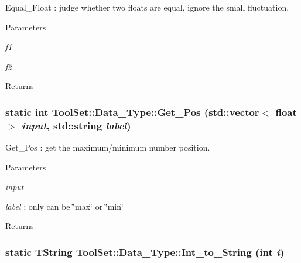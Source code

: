 Equal\_\-Float : judge whether two floats are equal, ignore the small fluctuation. 
\begin{DoxyParams}{Parameters}
\item[{\em f1}]\item[{\em f2}]\end{DoxyParams}
\begin{DoxyReturn}{Returns}

\end{DoxyReturn}
\hypertarget{classToolSet_1_1Data__Type_af1b26e30319e2a924f2b110c7e42b16c}{
\subsubsection[{Get\_\-Pos}]{\setlength{\rightskip}{0pt plus 5cm}static int ToolSet::Data\_\-Type::Get\_\-Pos (std::vector$<$ float $>$ {\em input}, \/  std::string {\em label})}}
\label{classToolSet_1_1Data__Type_af1b26e30319e2a924f2b110c7e42b16c}


Get\_\-Pos : get the maximum/minimum number position. 
\begin{DoxyParams}{Parameters}
\item[{\em input}]\item[{\em label}]: only can be \char`\"{}max\char`\"{} or \char`\"{}min\char`\"{}\end{DoxyParams}
\begin{DoxyReturn}{Returns}

\end{DoxyReturn}
\hypertarget{classToolSet_1_1Data__Type_a5a180aac27b1ffee7f3986ee49a36fe4}{
\subsubsection[{Int\_\-to\_\-String}]{\setlength{\rightskip}{0pt plus 5cm}static TString ToolSet::Data\_\-Type::Int\_\-to\_\-String (int {\em i})}}
\label{classToolSet_1_1Data__Type_a5a180aac27b1ffee7f3986ee49a36fe4}


